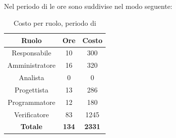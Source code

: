 \subsection{\VV}
Nel periodo di \VV{} le ore sono suddivise nel modo seguente:
\begin{table}[H]
	\centering
	\begin{tabular}{|c|c|c|}
		\hline
		\textbf{Ruolo} &
		\textbf{Ore} &
		\textbf{Costo} \\
		\hline
		Responsabile & 10 & 300\\
		\hline
		Amministratore & 16 & 320\\
		\hline
		Analista & 0 & 0\\
		\hline
		Progettista & 13 & 286 \\
		\hline
		Programmatore & 12 & 180 \\
		\hline
		Verificatore & 83 & 1245\\
		\hline
		\textbf{Totale} & \textbf{134} & \textbf{2331} \\
		\hline
	\end{tabular}
	\caption{Costo per ruolo, periodo di \VV}
\end{table}

